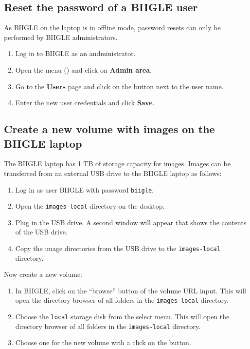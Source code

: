 \subsection*{Reset the password of a BIIGLE user}

As BIIGLE on the laptop is in offline mode, password resets can only be performed by BIIGLE administrators.

\begin{enumerate}
    \item Log in to BIIGLE as an andministrator.
    \item Open the menu () and click on \textbf{Admin area}.
    \item Go to the \textbf{Users} page and click on the  button next to the user name.
    \item Enter the new user credentials and click \textbf{Save}.
\end{enumerate}

\subsection*{Create a new volume with images on the BIIGLE laptop}

The BIIGLE laptop has 1 TB of storage capacity for images. Images can be transferred from an external USB drive to the BIIGLE laptop as follows:

\begin{enumerate}
    \item Log in as user BIIGLE with password \texttt{biigle}.
    \item Open the \texttt{images-local} directory on the desktop.
    \item Plug in the USB drive. A second window will appear that shows the contents of the USB drive.
    \item Copy the image directories from the USB drive to the \texttt{images-local} directory.
\end{enumerate}

Now create a new volume:

\begin{enumerate}
    \item In BIIGLE, click on the ``browse'' button of the volume URL input.
    This will open the directory browser of all folders in the \texttt{images-local} directory.
    \item Choose the \texttt{local} storage disk from the select menu. This will open the directory browser of all folders in the \texttt{images-local} directory.
    \item Choose one for the new volume with a click on the  button.
\end{enumerate}

